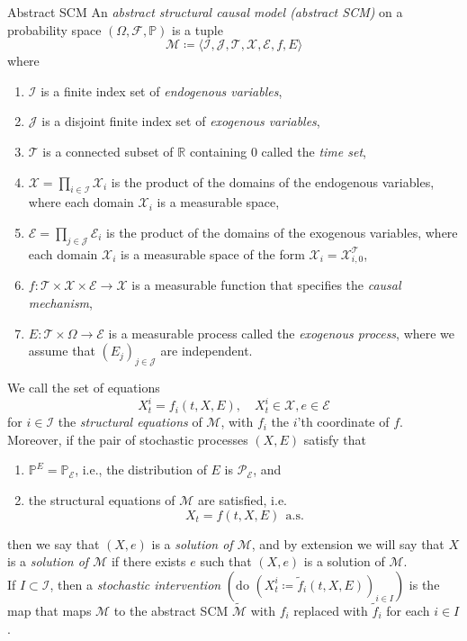 \documentclass[11pt, a4paper]{memoir}
\theoremstyle{break}
\theoremstyle{break}
\theoremstyle{nonumberplain}
\newcommand{\mR}{\mathbb{R}}
\newcommand{\mP}{\mathbb{P}}
\begin{document}
\begin{mydefinition}{Abstract SCM}
An \emph{abstract structural causal model (abstract SCM)} on a probability space $(\Omega,\mathcal{F},\mP)$ is a tuple
$$\mathcal{M}\coloneqq \langle \mathcal{I},\mathcal{J},\mathcal{T},\mathcal{X},\mathcal{E},f,E\rangle$$
where
\begin{enumerate}[label=\arabic*.]
	\item $\mathcal{I}$ is a finite index set of \emph{endogenous variables},
	\item $\mathcal{J}$ is a disjoint finite index set of \emph{exogenous variables},
	\item $\mathcal{T}$ is a connected subset of $\mR$ containing 0 called the \emph{time set},
	\item $\mathcal{X}=\prod_{i\in \mathcal{I}}\mathcal{X}_i$ is the product of the domains of the endogenous variables, where each domain $\mathcal{X}_i$ is a measurable space,
	\item $\mathcal{E}=\prod_{j\in \mathcal{J}}\mathcal{E}_i$ is the product of the domains of the exogenous variables, where each domain $\mathcal{X}_i$ is a measurable space of the form $\mathcal{X}_i=\mathcal{X}_{i,0}^{\mathcal{T}}$,
	\item $f:\mathcal{T}\times \mathcal{X}\times \mathcal{E}\to\mathcal{X}$ is a measurable function that specifies the \emph{causal mechanism},
	\item $E:\mathcal{T}\times \Omega\to \mathcal{E}$ is a measurable process called the \emph{exogenous process}, where we assume that $(E_j)_{j\in \mathcal{J}}$ are independent.
\end{enumerate}
We call the set of equations
$$X_t^i=f_i(t,X,E),\quad X_t^i\in \mathcal{X},e\in \mathcal{E}$$
for $i\in \mathcal{I}$ the \emph{structural equations} of $\mathcal{M}$, with $f_i$ the $i$'th coordinate of $f$.\\[5pt]
Moreover, if the pair of stochastic processes $(X,E)$ satisfy that
\begin{enumerate}[label=\roman*.]
	\item $\mP^E=\mP_\mathcal{E}$, i.e., the distribution of $E$ is $\mathcal{P}_\mathcal{E}$, and
	\item the structural equations of $\mathcal{M}$ are satisfied, i.e.
	$$X_t=f(t,X,E)\ \ \text{a.s.}$$
\end{enumerate}
then we say that $(X,e)$ is a \emph{solution of $\mathcal{M}$}, and by extension we will say that $X$ is a \emph{solution of $\mathcal{M}$} if there exists $e$ such that $(X,e)$ is a solution of $\mathcal{M}$.\\[5pt]
If  $I\subset \mathcal{I}$, then a \emph{stochastic intervention} $(\text{do } (X_t^i\coloneqq \tilde{f}_i(t,X,E))_{i\in I})$ is the map that maps $\mathcal{M}$ to the abstract SCM $\tilde{\mathcal{M}}$ with $f_i$ replaced with $\tilde{f}_i$ for each $i\in I$.
\end{mydefinition}
\end{document}

